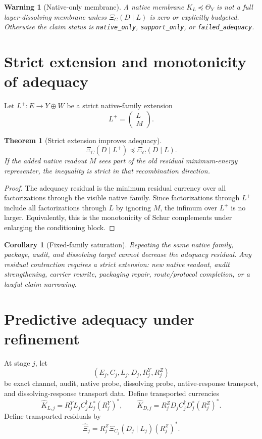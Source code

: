 \documentclass[11pt]{article}
\newtheorem{theorem}{Theorem}
\newtheorem{corollary}{Corollary}
\newtheorem{warning}{Warning}
\begin{document}
\begin{warning}[Native-only membrane]
A native membrane $K_L\preceq\Theta_Y$ is not a full layer-dissolving membrane unless $\Xi_C(D\mid L)$ is zero or explicitly budgeted.  Otherwise the claim status is \texttt{native\_only}, \texttt{support\_only}, or \texttt{failed\_adequacy}.
\end{warning}

\section{Strict extension and monotonicity of adequacy}
Let $L^+:E\to Y\oplus W$ be a strict native-family extension
\[
L^+ = \begin{pmatrix} L\\ M\end{pmatrix}.
\]

\begin{theorem}[Strict extension improves adequacy]
\[
\boxed{
\Xi_C(D\mid L^+)\preceq \Xi_C(D\mid L).
}
\]
If the added native readout $M$ sees part of the old residual minimum-energy representer, the inequality is strict in that recombination direction.
\end{theorem}
\begin{proof}
The adequacy residual is the minimum residual currency over all factorizations through the visible native family.  Since factorizations through $L^+$ include all factorizations through $L$ by ignoring $M$, the infimum over $L^+$ is no larger.  Equivalently, this is the monotonicity of Schur complements under enlarging the conditioning block.
\end{proof}

\begin{corollary}[Fixed-family saturation]
Repeating the same native family, package, audit, and dissolving target cannot decrease the adequacy residual.  Any residual contraction requires a strict extension: new native readout, audit strengthening, carrier rewrite, packaging repair, route/protocol completion, or a lawful claim narrowing.
\end{corollary}

\section{Predictive adequacy under refinement}
At stage $j$, let
\[
(E_j,C_j,L_j,D_j,R^Y_j,R^Z_j)
\]
be exact channel, audit, native probe, dissolving probe, native-response transport, and dissolving-response transport data.  Define transported currencies
\[
\widehat K_{L,j}=R^Y_j L_j C_j^\dagger L_j^*(R^Y_j)^*,
\qquad
\widehat K_{D,j}=R^Z_j D_j C_j^\dagger D_j^*(R^Z_j)^*.
\]
Define transported residuals by
\[
\widehat\Xi_j
=R^Z_j\Xi_{C_j}(D_j\mid L_j)(R^Z_j)^*.
\]
\end{document}
